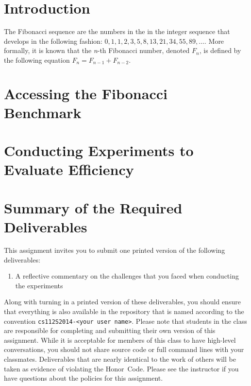 


\usepackage[compact]{titlesec}


\section*{Introduction}

The Fibonacci sequence are the numbers in the in the integer sequence that develops in the following fashion:
$0, 1, 1, 2, 3, 5, 8, 13, 21, 34, 55, 89, \ldots$. More formally, it is known that the {\em n}-th Fibonacci number,
denoted $F_n$, is defined by the following equation $F_n = F_{n-1} + F_{n-2}$.

\section*{Accessing the Fibonacci Benchmark}

\section*{Conducting Experiments to Evaluate Efficiency}

\section*{Summary of the Required Deliverables}

  This assignment invites you to submit one printed version of the following deliverables: 

  \begin{enumerate} 
    
    \item A reflective commentary on the challenges that you faced when conducting the experiments
   
  \end{enumerate}

  Along with turning in a printed version of these deliverables, you should ensure that everything is also available in
  the repository that is named according to the convention {\tt cs112S2014-<your user name>}. Please note that students
  in the class are responsible for completing and submitting their own version of this assignment.    While it is
  acceptable for members of this class to have high-level conversations, you should not share source code or full
  command lines with your classmates.  Deliverables that are nearly identical to the work of others will be taken as
  evidence of violating the \mbox{Honor Code}.  Please see the instructor if you have questions about the policies for
  this assignment.

  
